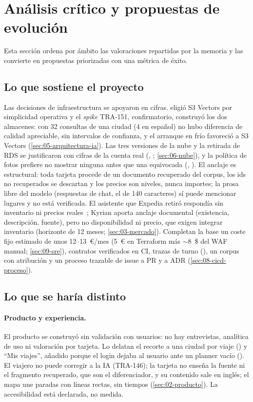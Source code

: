\section{Análisis crítico y propuestas de evolución}\label{sec:10-analisis-critico}

Esta sección ordena por ámbito las valoraciones repartidas por la memoria y las convierte en
propuestas priorizadas con una métrica de éxito.

\subsection{Lo que sostiene el proyecto}

Las decisiones de infraestructura se apoyaron en cifras.  eligió S3 Vectors por
simplicidad operativa y el \emph{spike} TRA-151, confirmatorio, construyó los dos almacenes: con
32 consultas de una ciudad (4 en español) no hubo diferencia de calidad apreciable, sin intervalos
de confianza, y el arranque en frío favoreció a S3 Vectors (\cref{sec:05-arquitectura-ia}). Las
tres versiones de la nube y la retirada de RDS se justificaron con cifras de la cuenta real
(, ; \cref{sec:06-nube}), y la política de fotos prefiere no mostrar ninguna
antes que una equivocada (, ). El anclaje es estructural: toda tarjeta procede
de un documento recuperado del corpus, los ids no recuperados se descartan y los precios son
niveles, nunca importes; la prosa libre del modelo (respuestas de chat, el  de 140
caracteres) sí puede mencionar lugares y no está verificada. El asistente que Expedia retiró
respondía sin inventario ni precios reales~\cite{mk:romie}; Kyrian aporta anclaje documental
(existencia, descripción, fuente), pero no disponibilidad ni precio, que exigen integrar inventario
(horizonte de 12 meses; \cref{sec:03-mercado}). Completan la base un coste fijo estimado de unos
12--13~€/mes (5~€ en Terraform más $\sim$8~\$ del WAF manual; \cref{sec:09-sre}), contratos
verificados en CI, trazas de turno (), un corpus con atribución y un proceso trazable de
issue a PR y a ADR (\cref{sec:08-cicd-proceso}).

\subsection{Lo que se haría distinto}

\paragraph{Producto y experiencia.} El producto se construyó sin validación con usuarios: no hay
entrevistas, analítica de uso ni valoración por tarjeta. Lo delatan el recorte a una ciudad por
viaje () y ``Mis viajes'', añadido porque el login dejaba al usuario ante un planner
vacío (). El viajero no puede corregir a la IA (TRA-146); la tarjeta no enseña la fuente
ni el fragmento recuperado, que son el diferenciador, y su contenido sale en inglés; el mapa une
paradas con líneas rectas, sin tiempos (\cref{sec:02-producto}). La accesibilidad está declarada,
no medida.

